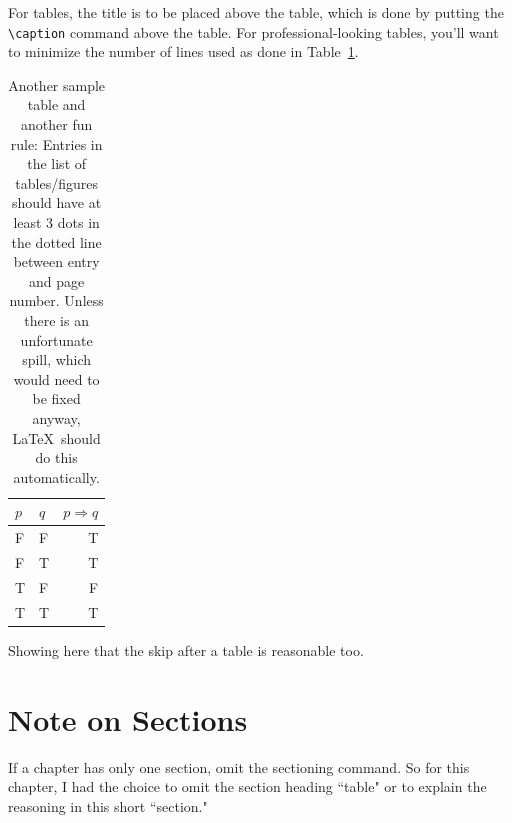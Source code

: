 For tables, the title is to be placed above the table,
which is done by putting the \verb+\caption+ command
above the table.
For professional-looking tables, you'll want to minimize
the number of lines used as done in Table~\ref{tablelabel2}.

\begin{table}[h]
	\caption{Another sample table and another fun rule:
	Entries in the list of tables/figures
	should have at least 3 dots in the dotted
	line between entry and page number. Unless there is
	an unfortunate spill, which would need to be fixed anyway,
	\LaTeX \ should do this automatically.
	}
	\label{tablelabel2}
	\centering
	\begin{tabular}{l l  r}
	\toprule
	$p$ & $q$ & $p\Rightarrow q$ \\
	\midrule
	F   & F   & T \\
	F   & T  & T \\
	T  & F   & F  \\
	T  & T  & T  \\
	\bottomrule
	\end{tabular}
\end{table}
Showing here that the skip after a table is reasonable too.

\section{Note on Sections}

If a chapter has only one section, omit the sectioning command.
So for this chapter, I had the choice to omit the section heading
``table" or to explain the reasoning in this short ``section."
